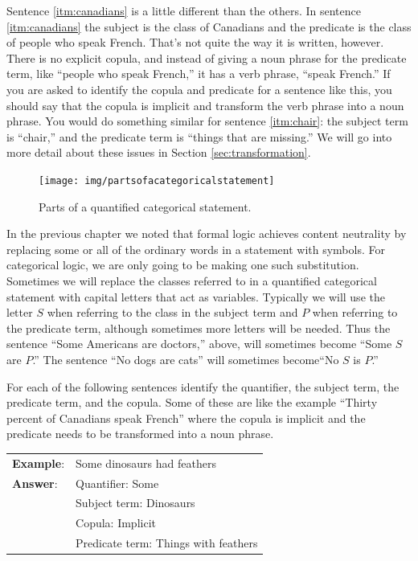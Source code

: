 Sentence \ref{itm:canadians} is a little different than the others. In sentence \ref{itm:canadians} the subject is the class of Canadians and the predicate is the class of people who speak French. That's not quite the way it is written, however. There is no explicit copula, and instead of giving a noun phrase for the predicate term, like ``people who speak French,'' it has a verb phrase, ``speak French.'' If you are asked to identify the copula and predicate for a sentence like this, you should say that the copula is implicit and transform the verb phrase into a noun phrase. You would do something similar for sentence \ref{itm:chair}: the subject term is ``chair,'' and the predicate term is ``things that are missing.'' We will go into more detail about these issues in Section \ref{sec:transformation}.


\begin{figure}
\begin{mdframed}[style=mytableclearbox]
\texttt{[image: img/partsofacategoricalstatement]}
\end{mdframed}
\caption{Parts of a quantified categorical statement.}
\label{fig:Partsofacategoricalstatement}
\end{figure}

In the previous chapter we noted that formal logic achieves content neutrality by replacing some or all of the ordinary words in a statement with symbols. For categorical logic, we are only going to be making one such substitution. Sometimes we will replace the classes referred to in a quantified categorical statement with capital letters that act as variables. Typically we will use the letter $S$ when referring to the class in the subject term and $P$ when referring to the predicate term, although sometimes more letters will be needed. Thus the sentence ``Some Americans are doctors,'' above, will sometimes become ``Some $S$ are $P$.'' The sentence ``No dogs are cats'' will sometimes become``No $S$ is $P$.''


\practiceproblems
\problempart For each of the following sentences identify the quantifier, the subject term, the predicate term, and the copula. Some of these are like the example ``Thirty percent of Canadians speak French'' where the copula is implicit and the predicate needs to be transformed into a noun phrase.

\begin{longtabu}{p{.1\linewidth}p{.9\linewidth}}
\textbf{Example}: & Some dinosaurs had feathers\\
\textbf{Answer}: & Quantifier: Some \\
&Subject term: Dinosaurs \\
&Copula: Implicit \\
& Predicate term: Things with feathers \\
\end{longtabu}

